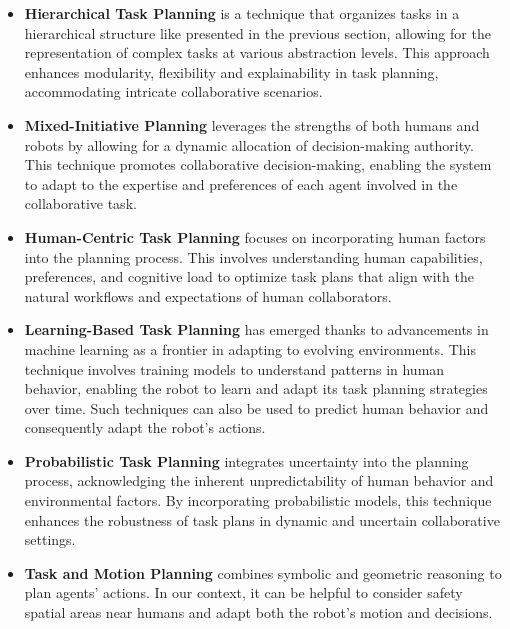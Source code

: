 \begin{itemize}
    \item \textbf{Hierarchical Task Planning} is a technique that organizes tasks in a hierarchical structure like presented in the previous section, allowing for the representation of complex tasks at various abstraction levels. This approach enhances modularity, flexibility and explainability in task planning, accommodating intricate collaborative scenarios.
    
    \item \textbf{Mixed-Initiative Planning} leverages the strengths of both humans and robots by allowing for a dynamic allocation of decision-making authority. This technique promotes collaborative decision-making, enabling the system to adapt to the expertise and preferences of each agent involved in the collaborative task.
    
    \item \textbf{Human-Centric Task Planning} focuses on incorporating human factors into the planning process. This involves understanding human capabilities, preferences, and cognitive load to optimize task plans that align with the natural workflows and expectations of human collaborators.
    
    \item \textbf{Learning-Based Task Planning} has emerged thanks to advancements in machine learning as a frontier in adapting to evolving environments. This technique involves training models to understand patterns in human behavior, enabling the robot to learn and adapt its task planning strategies over time. Such techniques can also be used to predict human behavior and consequently adapt the robot's actions.
    
    \item \textbf{Probabilistic Task Planning} integrates uncertainty into the planning process, acknowledging the inherent unpredictability of human behavior and environmental factors. By incorporating probabilistic models, this technique enhances the robustness of task plans in dynamic and uncertain collaborative settings.
    
    \item \textbf{Task and Motion Planning} combines symbolic and geometric reasoning to plan agents' actions. In our context, it can be helpful to consider safety spatial areas near humans and adapt both the robot's motion and decisions. 
    
\end{itemize}

